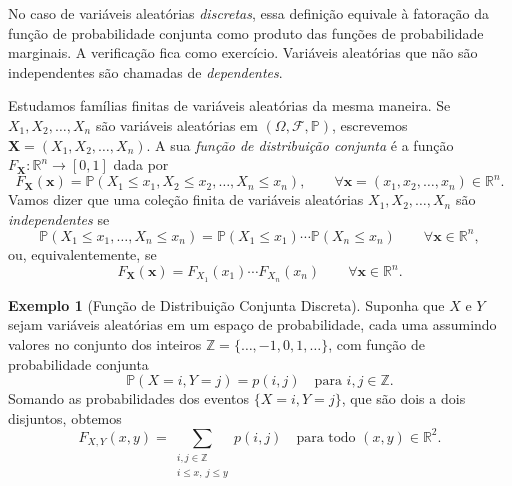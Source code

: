 \documentclass[12pt,portuguese]{article}
\theoremstyle{definition}
\newtheorem{example}[example]{Exemplo}
\theoremstyle{plainexercise}
\theoremstyle{starredexercise}
\theoremstyle{definition}
\begin{document}
No caso de variáveis aleatórias \emph{discretas}, essa definição equivale
à fatoração da função de probabilidade conjunta como produto das funções
de probabilidade marginais. A verificação fica como exercício.
Variáveis aleatórias que não são independentes são chamadas de
\emph{dependentes}.

Estudamos famílias finitas de variáveis aleatórias da mesma maneira.
Se $X_1, X_2, \ldots, X_n$ são variáveis aleatórias em
$(\Omega, \mathcal{F}, \mathbb{P})$, escrevemos
$\mathbf{X} = (X_1, X_2, \ldots, X_n)$. A sua \emph{função de
distribuição conjunta} é a função
$F_{\mathbf{X}} : \mathbb{R}^n \to [0, 1]$ dada por
\begin{equation}
\label{eq:distribuicao-conjunta-n-dimensoes}
  F_{\mathbf{X}}(\mathbf{x})
  = \mathbb{P}(X_1 \leqslant x_1, X_2 \leqslant x_2, \ldots, X_n \leqslant x_n),
  \qquad \forall \mathbf{x} = (x_1, x_2, \ldots, x_n) \in \mathbb{R}^n.
\end{equation}
Vamos dizer que uma coleção finita de variáveis aleatórias
$X_1, X_2, \ldots, X_n$ são \emph{independentes} se
\[
  \mathbb{P}(X_1 \leqslant x_1, \ldots, X_n \leqslant x_n)
  = \mathbb{P}(X_1 \leqslant x_1)\cdots\mathbb{P}(X_n \leqslant x_n)
  \qquad \forall \mathbf{x} \in \mathbb{R}^n,
\]
ou, equivalentemente, se
\begin{equation}
\label{eq:fatoracao-distribuicao-n-dimensoes}
  F_{\mathbf{X}}(\mathbf{x})
  = F_{X_1}(x_1)\cdots F_{X_n}(x_n)
  \qquad \forall\mathbf{x} \in \mathbb{R}^n.
\end{equation}

\begin{example}[Função de Distribuição Conjunta Discreta]\label{ex:distribuicao-conjunta-discreta}
Suponha que $X$ e $Y$ sejam variáveis aleatórias em um espaço de probabilidade,
cada uma assumindo valores no conjunto dos inteiros
$\mathbb{Z} = \{\ldots, -1, 0, 1, \ldots\}$,
com função de probabilidade conjunta
\[
  \mathbb{P}(X = i, Y = j) = p(i, j)
  \quad\text{para } i, j \in \mathbb{Z}.
\]
Somando as probabilidades dos eventos $\{X = i, Y = j\}$,
que são dois a dois disjuntos, obtemos
\[
  F_{X,Y}(x, y)
  = \sum_{\substack{i,j\in\mathbb{Z} \\ i\leqslant x,\ j\leqslant y}} p(i, j)
  \quad\text{para todo } (x, y) \in \mathbb{R}^2.
\]
\end{example}
\end{document}
